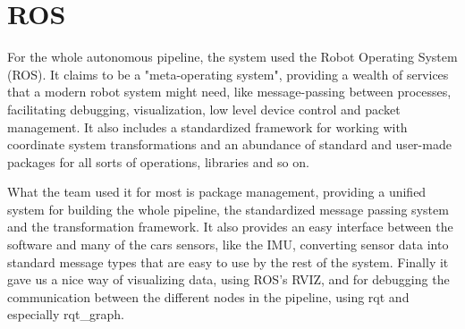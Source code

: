 \section{ROS}

For the whole autonomous pipeline, the system used the Robot Operating System (ROS)\cite{ROS}. It claims to be a "meta-operating system", providing a wealth of services that a modern robot system might need, like message-passing between processes, facilitating debugging, visualization, low level device control and packet management. It also includes a standardized framework for working with coordinate system transformations and an abundance of standard and user-made packages for all sorts of operations, libraries and so on. 

What the team used it for most is package management, providing a unified system for building the whole pipeline, the standardized message passing system and the transformation framework. It also provides an easy interface between the software and many of the cars sensors, like the IMU, converting sensor data into standard message types that are easy to use by the rest of the system. Finally it gave us a nice way of visualizing data, using ROS's RVIZ, and for debugging the communication between the different nodes in the pipeline, using rqt and especially rqt\_graph.